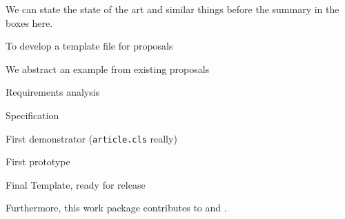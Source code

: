 \begin{workpackage}[id=temple,type=DEM,lead=bar,
  wphases=6-12!1,
  title={\pn} Proposal Template,short=Template,barRM=6,bazRM=6]
We can state the state of the art and similar things before the summary in the boxes
here. 
\wpheadertable

\begin{wpobjectives}
  To develop a template file for {\pn} proposals
\end{wpobjectives}

\begin{wpdescription}
  We abstract an example from existing proposals
\end{wpdescription}

\begin{wpdelivs}
  \begin{wpdeliv}[due=6,id=req,nature=R,dissem=PP,miles=kickoff,lead=bar]
    {Requirements analysis}
  \end{wpdeliv}
  \begin{wpdeliv}[due=12,id=spec,nature=R,dissem=PU,miles=consensus,lead=baz]
    {{\pn} Specification }
  \end{wpdeliv}
  \begin{wpdeliv}[due=18,id=demonstrator,nature=D,dissem=PU,miles={consensus,final},lead=bar]
    {First demonstrator ({\tt{article.cls}} really)}
  \end{wpdeliv}
  \begin{wpdeliv}[due=24,id=proto,nature=P,dissem=PU,miles=final,lead=baz]
    {First prototype}
  \end{wpdeliv}
  \begin{wpdeliv}[due=36,id=release,nature=P,dissem=PU,miles=final,lead=bar]
    {Final Template, ready for release}
  \end{wpdeliv}
\end{wpdelivs}
Furthermore, this work package contributes to {} and
{}.
\end{workpackage}


